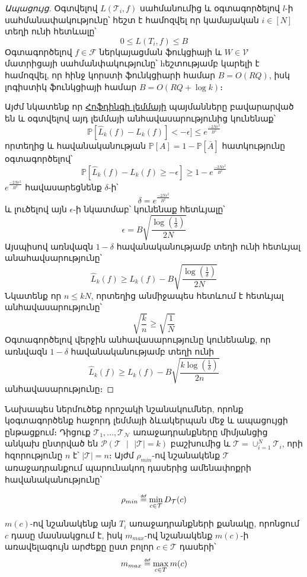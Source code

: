 \documentclass[12pt]{article}
\newcommand\defeq{\mathrel{\overset{\makebox[0pt]{\mbox{\normalfont\tiny\sffamily def}}}{=}}}
\begin{document}
\begin{proof}[Ապացույց]
Օգտվելով $L(\mathcal{T}_i, f)$ սահմանումից և օգտագործելով $l$-ի սահմանափակությունը՝ հեշտ է համոզվել որ կամայական $i \in [N]$ տեղի ունի հետևալը՝
$$0 \leq L(T_i,f) \leq B$$
Օգտագործելով $f \in \mathcal{F}$ ներկայացման ֆուկցիայի և $W\in \mathcal{V}$ մատրիցայի  սահմանփակությունը՝ hեշտությամբ կարելի է համոզվել, որ հինջ կորստի ֆունկցիարի համար $B = O(RQ)$, իսկ լոգիստիկ ֆունկցիայի համար $B = O(RQ+\log k)$։
\par Այժմ նկատենք որ \hyperref [hofding_inq]{Հոֆդինգի լեմմայի} պայմանները բավարարված են և օգտվելով այդ լեմմայի անհավասարությունից կունենաք՝
$$\mathbb{P}[\hat{L}_k(f) - L_k(f)]< -\epsilon] \leq e^{\frac{-2N\epsilon^2}{B^2}}$$
որտեղից և հավանականության $\mathbb{P}[A] = 1 - \mathbb{P}[\bar A]$ հատկությունը օգտագործելով՝
$$\mathbb{P}[\hat{L}_k(f) - L_k(f) \geq -\epsilon] \geq 1 -e^{\frac{-2N\epsilon^2}{B^2}} $$
$e^{\frac{-2N\epsilon^2}{B^2}}$ հավասարեցնենք $\delta$-ի՝
$$\delta = e^{\frac{-2N\epsilon^2}{B^2}}$$
և լուծելով այն $\epsilon$-ի նկատմաբ՝ կունենաք հետևյալը՝
$$\epsilon = B \sqrt{ \frac{\log\left(\frac{1}{\delta}\right)}{2N}} $$
Այսպիսով առնվազն $1-\delta$ հավանականությամբ տեղի ունի հետևյալ անահավսարությունը՝
$$\hat{L}_k(f) \geq L_k(f) - B \sqrt{ \frac{\log\left(\frac{1}{\delta}\right)}{2N}}$$
Նկատենք որ $n \leq kN$, որտեղից անմիջապես հետևում է հետևյալ անհավասարությունը՝
$$\sqrt{\frac{k}{n}} \geq \sqrt{\frac{1}{N}}$$
Օգտագործելով վերջին անհավասարությունը կունենանք, որ առնվազն $1-\delta$ հավանականությամբ տեղի ունի
$$\hat{L}_k(f) \geq L_k(f) - B\sqrt{\frac{k\log \left(\frac{1}{\delta}\right) }{2n}}$$
անհավասարությունը։
\end{proof}


Նախապես ներմուծեք որոշակի նշանակումներ, որոնք  կօգտագործենք հաջորդ լեմմայի ձևակերպան մեջ և ապացույցի ընթացքում։ Դիցուք $\mathcal{T}_1, ..., \mathcal{T_N}$ առաջադրանքները միմյանցից անկախ ընտրված են $\mathcal{P}(\mathcal{T} \text{ } |\text{ }  |\mathcal{T}| = k)$ բաշխումից և $\mathcal{T} = \cup_{i=1}^N{\mathcal{T}_i}$, որի հզորությունը $n$ է՝ $|\mathcal{T}| =  n$։
Այժմ $\rho_{min}$-ով նշանակենք $\mathcal{T}$ առաջադրանքում պարունակող դասերից ամենափոքրի հավանականությունը՝  

\begin{align}
\label{rhomin}
\rho_{min}  \defeq \min_{c \in \mathcal{T} } D_\mathcal{T}(c)
\end{align}

$m(c)$-ով նշանակենք այն $T_i$ առաջադրանքների քանակը, որոնցում $c$ դասը մասնակցում է, իսկ $m_{max}$-ով նշանակենք $m(c)$-ի առավելագույն արժեքը ըստ բոլոր $c \in \mathcal{T}$ դասերի՝
\begin{align}
\label{mmax}
m_{max} \defeq \max_{c \in T} m(c) 
\end{align}
\end{document}
